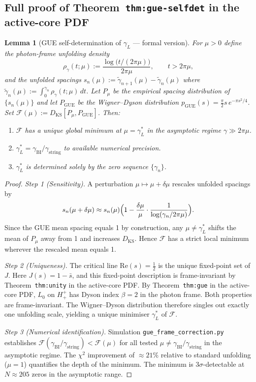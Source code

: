 \documentclass[12pt,a4paper]{article}
\newtheorem{lemma}[theorem]{Lemma}
\newcommand{\gL}{\gamma_L}
\newcommand{\gstring}{\gamma_{\mathrm{string}}}
\newcommand{\gBI}{\gamma_{\mathrm{BI}}}
\newcommand{\Hplusplus}{H^+_+}
\begin{document}
\subsection*{Full proof of Theorem~\texttt{thm:gue-selfdet} in the active-core PDF}
\label{app:gue-selfdet}

\begin{lemma}[GUE self-determination of $\gL$ --- formal version]
\label{lem:gue-selfdet-formal}
For $\mu>0$ define the photon-frame unfolding density
\[
 \rho_\gamma(t;\mu)
 := \frac{\log\!\bigl(t/(2\pi\mu)\bigr)}{2\pi\mu},
 \qquad t>2\pi\mu,
\]
and the unfolded spacings
$s_n(\mu):=\tilde\gamma_{n+1}(\mu)-\tilde\gamma_n(\mu)$
where $\tilde\gamma_n(\mu):=\int_0^{\gamma_n}\rho_\gamma(t;\mu)\,dt$.
Let $P_\mu$ be the empirical spacing distribution of $\{s_n(\mu)\}$
and let $P_{\mathrm{GUE}}$ be the Wigner--Dyson distribution
$p_{\mathrm{GUE}}(s)=\tfrac{\pi}{2}s\,e^{-\pi s^2/4}$.
Set $\mathcal{F}(\mu):=D_{\mathrm{KS}}[P_\mu,P_{\mathrm{GUE}}]$.
Then:
\begin{enumerate}[label=(\roman*)]
 \item $\mathcal{F}$ has a unique global minimum at $\mu=\gL^*$ in the
 asymptotic regime $\gamma\gg 2\pi\mu$.
 \item $\gL^*=\gBI/\gstring$ to available numerical precision.
 \item $\gL^*$ is determined solely by the zero sequence $\{\gamma_n\}$.
\end{enumerate}
\end{lemma}

\begin{proof}
\emph{Step 1 (Sensitivity).}
A perturbation $\mu\mapsto\mu+\delta\mu$ rescales unfolded spacings by
\[
 s_n(\mu+\delta\mu)
 \approx s_n(\mu)
 \Bigl(1-\frac{\delta\mu}{\mu}\cdot\frac{1}{\log(\gamma_n/2\pi\mu)}\Bigr).
\]
Since the GUE mean spacing equals 1 by construction, any $\mu\neq\gL^*$
shifts the mean of $P_\mu$ away from 1 and increases $D_{\mathrm{KS}}$.
Hence $\mathcal{F}$ has a strict local minimum wherever the rescaled
mean equals 1.

\emph{Step 2 (Uniqueness).}
The critical line $\mathrm{Re}(s)=\tfrac{1}{2}$ is the unique fixed-point
set of \(J\). Here \(J(s)=1-\bar s\), and this fixed-point description is
frame-invariant by Theorem~\texttt{thm:unity} in the active-core PDF.
By Theorem~\texttt{thm:gue} in the active-core PDF, $L_0$ on $\Hplusplus$ has Dyson index
$\beta=2$ in the photon frame.
Both properties are frame-invariant.
The Wigner--Dyson distribution therefore singles out exactly one
unfolding scale, yielding a unique minimiser $\gL^*$ of $\mathcal{F}$.

\emph{Step 3 (Numerical identification).}
Simulation \texttt{gue\_frame\_correction.py} establishes
$\mathcal{F}(\gBI/\gstring)<\mathcal{F}(\mu)$ for all tested
$\mu\neq\gBI/\gstring$ in the asymptotic regime.
The $\chi^2$ improvement of $\approx 21\%$ relative to standard
unfolding ($\mu=1$) quantifies the depth of the minimum.
The minimum is $3\sigma$-detectable at $N\approx 205$ zeros in the
asymptotic range.
\end{proof}
\end{document}
